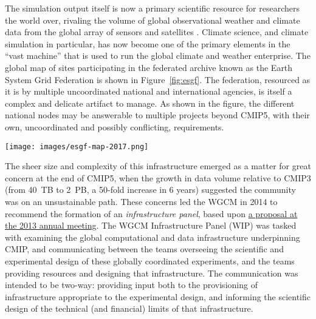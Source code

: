 \documentclass[gmd,manuscript]{copernicus}
\newcommand{\pipref}[1] {\citep{ref:#1}}
\newcommand{\figref}[1] {\mbox{Figure   \ref{fig:#1}}}
\begin{document}
The simulation output itself is now a primary scientific resource for
researchers the world over, rivaling the volume of global
observational weather and climate data from the global array of
sensors and satellites \pipref{overpecketal2011}. Climate science,
and climate simulation in particular, has now become one of the
primary elements in the ``vast machine'' \pipref{edwards2010}
that is used to run the global climate and weather enterprise. The
global map of sites participating in the federated archive known as
the Earth System Grid Federation \pipref{williamsetal2015} is shown
in \figref{esgf}. The federation, resourced as it is by multiple
uncoordinated national and international agencies, is itself a complex
and delicate artifact to manage. As shown in the figure, the different
national nodes may be answerable to multiple projects beyond CMIP5,
with their own, uncoordinated and possibly conflicting, requirements.


\begin{figure*}
  \begin{center}
    \texttt{[image: images/esgf-map-2017.png]}
  \end{center}
  \caption{Sites participating in the Earth System Grid Federation in
    2017. Figure courtesy Dean Williams, adapted from the ESGF Brochure.}
  \label{fig:esgf}
\end{figure*}



The sheer size and complexity of this infrastructure emerged as a
matter for great concern at the end of CMIP5, when the growth in data
volume relative to CMIP3 (from 40~TB to 2~PB, a 50-fold increase in 6
years) suggested the community was on an unsustainable path. These
concerns led the WGCM in 2014 to recommend the formation of an
\emph{infrastructure panel}, based upon \href{https://goo.gl/FHqbNN}{a
  proposal at the 2013 annual meeting}. The WGCM Infrastructure Panel
(WIP) was tasked with examining the global computational and data
infrastructure underpinning CMIP, and communicating between the teams
overseeing the scientific and experimental design of these globally
coordinated experiments, and the teams providing resources and
designing that infrastructure. The communication was intended to be
two-way: providing input both to the provisioning of infrastructure
appropriate to the experimental design, and informing the scientific
design of the technical (and financial) limits of that infrastructure.
\end{document}
